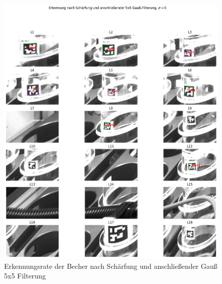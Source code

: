     \begin{figure}
        \caption[Erkennungsrate der Becher nach Schärfung und Gauß 5x5]{Erkennungsrate der Becher nach Schärfung und anschließender Gauß 5x5 Filterung}\label{fig:figure26}
        \includegraphics[width = \textwidth]{Bilder/ErkennungsrateScharfGauss.png}
        \centering
    \end{figure}

